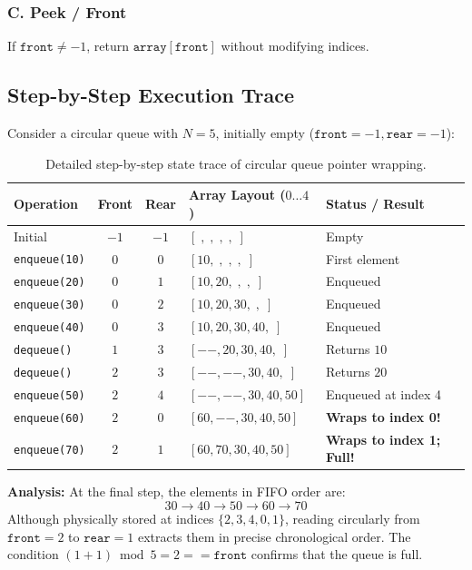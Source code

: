 \subsubsection{C. Peek / Front}
If $\texttt{front} \neq -1$, return $\texttt{array}[\texttt{front}]$ without modifying indices.

\subsection{Step-by-Step Execution Trace}

Consider a circular queue with $N = 5$, initially empty ($\texttt{front} = -1, \texttt{rear} = -1$):

\begin{table}[htbp]
\centering
\small
\begin{tabularx}{\textwidth}{l c c X l}
\toprule
\textbf{Operation} & \textbf{Front} & \textbf{Rear} & \textbf{Array Layout ($0 \dots 4$)} & \textbf{Status / Result} \\
\midrule
Initial        & $-1$ & $-1$ & $[\;,\;,\;,\;,\;]$               & Empty \\
\texttt{enqueue(10)} & $0$  & $0$  & $[10, \;,\;,\;,\;]$              & First element \\
\texttt{enqueue(20)} & $0$  & $1$  & $[10, 20, \;,\;,\;]$             & Enqueued \\
\texttt{enqueue(30)} & $0$  & $2$  & $[10, 20, 30, \;,\;]$            & Enqueued \\
\texttt{enqueue(40)} & $0$  & $3$  & $[10, 20, 30, 40, \;]$           & Enqueued \\
\texttt{dequeue()}   & $1$  & $3$  & $[--, 20, 30, 40, \;]$           & Returns $10$ \\
\texttt{dequeue()}   & $2$  & $3$  & $[--, --, 30, 40, \;]$           & Returns $20$ \\
\texttt{enqueue(50)} & $2$  & $4$  & $[--, --, 30, 40, 50]$           & Enqueued at index 4 \\
\texttt{enqueue(60)} & $2$  & $0$  & $[60, --, 30, 40, 50]$           & \textbf{Wraps to index 0!} \\
\texttt{enqueue(70)} & $2$  & $1$  & $[60, 70, 30, 40, 50]$           & \textbf{Wraps to index 1; Full!} \\
\bottomrule
\end{tabularx}
\caption{Detailed step-by-step state trace of circular queue pointer wrapping.}
\end{table}

\textbf{Analysis:} At the final step, the elements in FIFO order are:
\[
30 \longrightarrow 40 \longrightarrow 50 \longrightarrow 60 \longrightarrow 70
\]
Although physically stored at indices $\{2, 3, 4, 0, 1\}$, reading circularly from $\texttt{front} = 2$ to $\texttt{rear} = 1$ extracts them in precise chronological order. The condition $(1 + 1) \bmod 5 = 2 == \texttt{front}$ confirms that the queue is full.

